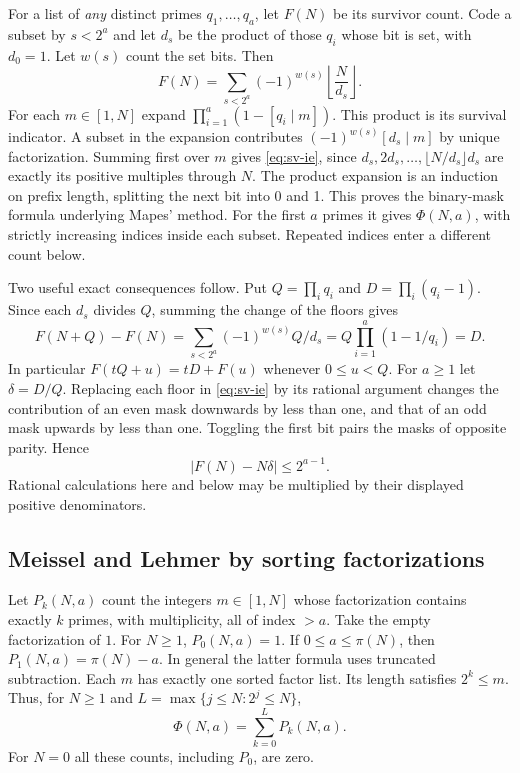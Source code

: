 For a list of \emph{any} distinct primes $q_1,\ldots,q_a$, let $F(N)$ be its survivor count. Code a subset by $s<2^a$ and let $d_s$ be the product of those $q_i$ whose bit is set, with $d_0=1$. Let $w(s)$ count the set bits. Then
\begin{equation}
 F(N)=\sum_{s<2^a}(-1)^{w(s)}\left\lfloor\frac{N}{d_s}\right\rfloor .
 \label{eq:sv-ie}
\end{equation}
For each $m\in[1,N]$ expand $\prod_{i=1}^a(1-[q_i\mid m])$. This product is its survival indicator. A subset in the expansion contributes $(-1)^{w(s)}[d_s\mid m]$ by unique factorization. Summing first over $m$ gives \eqref{eq:sv-ie}, since $d_s,2d_s,\ldots,\lfloor N/d_s\rfloor d_s$ are exactly its positive multiples through $N$. The product expansion is an induction on prefix length, splitting the next bit into 0 and 1. This proves the binary-mask formula underlying Mapes' method. For the first $a$ primes it gives $\Phi(N,a)$, with strictly increasing indices inside each subset. Repeated indices enter a different count below.

Two useful exact consequences follow. Put $Q=\prod_i q_i$ and $D=\prod_i(q_i-1)$. Since each $d_s$ divides $Q$, summing the change of the floors gives
\[
 F(N+Q)-F(N)=\sum_{s<2^a}(-1)^{w(s)}Q/d_s
 =Q\prod_{i=1}^a(1-1/q_i)=D.
\]
In particular $F(tQ+u)=tD+F(u)$ whenever $0\le u<Q$. For $a\ge1$ let $\delta=D/Q$. Replacing each floor in \eqref{eq:sv-ie} by its rational argument changes the contribution of an even mask downwards by less than one, and that of an odd mask upwards by less than one. Toggling the first bit pairs the masks of opposite parity. Hence
\begin{equation}
 |F(N)-N\delta|\le 2^{a-1}.
 \label{eq:sv-floor-bound}
\end{equation}
Rational calculations here and below may be multiplied by their displayed positive denominators.

\subsection{Meissel and Lehmer by sorting factorizations}

Let $P_k(N,a)$ count the integers $m\in[1,N]$ whose factorization contains exactly $k$ primes, with multiplicity, all of index $>a$. Take the empty factorization of $1$. For $N\ge1$, $P_0(N,a)=1$. If $0\le a\le\pi(N)$, then $P_1(N,a)=\pi(N)-a$. In general the latter formula uses truncated subtraction. Each $m$ has exactly one sorted factor list. Its length satisfies $2^k\le m$. Thus, for $N\ge1$ and $L=\max\{j\le N:2^j\le N\}$,
\[
 \Phi(N,a)=\sum_{k=0}^L P_k(N,a).
\]
For $N=0$ all these counts, including $P_0$, are zero.

